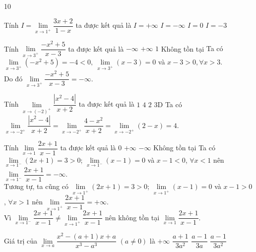 \begin{indapan}{10}
\begin{ex}%
	Tính $I =\lim\limits_{x \to 1^+} \dfrac{3x+2}{1-x}$ ta được kết quả là
	\choice
	{$I=+\infty$}
	{\True $I=-\infty$}
	{$I=0$}
	{$I=-3$}
\end{ex}

\begin{ex}%
	Tính $\lim\limits_{x\to 3^+}\dfrac{-x^2+5}{x-3}$ ta được kết quả là
	\choice
	{\True $-\infty$}
	{$+\infty$}
	{$1$}
	{Không tồn tại}
	\loigiai
	{
		Ta có $\lim\limits_{x\to 3^+}(-x^2+5)=-4<0,\ \lim\limits_{x\to 3^+}(x-3)=0$ và $x-3>0,\forall x>3$.\\ Do đó $\lim\limits_{x\to 3^+}\dfrac{-x^2+5}{x-3}=-\infty$.
	}
\end{ex}

\begin{ex}%
	Tính $\lim\limits_{x\to (-2)^+}\dfrac{\left| x^2-4\right| }{x+2}$ ta được kết quả là
	\choice
	{$1$}
	{\True $4$}
	{$2$}
	{$3$D}
	\loigiai
	{
		Ta có $\lim\limits_{x\to -2^+}\dfrac{|x^2-4|}{x+2}=\lim\limits_{x\to -2^+}\dfrac{4-x^2}{x+2}=\lim\limits_{x\to -2^+}(2-x)=4$.
	}
\end{ex}

\begin{ex}%
	Tính $\lim\limits_{x\to 1} \dfrac{2x+1}{x-1}$ ta được kết quả là
	\choice
	{$0$}
	{$+\infty$}
	{$-\infty$}
	{\True Không tồn tại}
	\loigiai
	{
		Ta có $\lim\limits_{x\to 1^{-}}(2x+1)=3>0$; $\lim\limits_{x\to1^{-}}(x-1)=0$ và $x-1<0$, $\forall x<1$ nên $\lim\limits_{x\to 1^{-}}\dfrac{2x+1}{x-1}=-\infty$.\\
		Tương tự, ta cũng có $\lim\limits_{x\to 1^{+}}(2x+1)=3>0$; $\lim\limits_{x\to1^{+}}(x-1)=0$ và $x-1>0$, $\forall x>1$ nên $\lim\limits_{x\to 1^{+}}\dfrac{2x+1}{x-1}=+\infty$.\\
		Vì $\lim\limits_{x\to 1^{-}}\dfrac{2x+1}{x-1}\ne \lim\limits_{x\to 1^{+}}\dfrac{2x+1}{x-1}$ nên không tồn tại $\lim\limits_{x\to 1} \dfrac{2x+1}{x-1}$.
	}
\end{ex}

\begin{ex}%
	Giá trị của $\lim\limits_{x \to a} \dfrac{x^2 - \left( a + 1\right)x + a}{x^3 - a^3}$ $(a\ne 0)$ là
	\choice
	{$ + \infty $}
	{$\dfrac{a + 1}{3a^2}$}
	{$\dfrac{a - 1}{3a}$}
	{\True $\dfrac{a - 1}{3a^2}$}
\end{ex}


\end{indapan}
